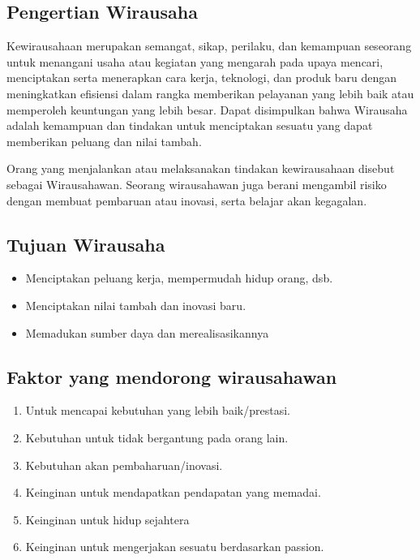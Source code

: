 \hypertarget{pengertian-wirausaha}{%
\subsection{Pengertian Wirausaha}\label{pengertian-wirausaha}}

Kewirausahaan merupakan semangat, sikap, perilaku, dan kemampuan
seseorang untuk menangani usaha atau kegiatan yang mengarah pada upaya
mencari, menciptakan serta menerapkan cara kerja, teknologi, dan produk
baru dengan meningkatkan efisiensi dalam rangka memberikan pelayanan
yang lebih baik atau memperoleh keuntungan yang lebih besar. Dapat
disimpulkan bahwa Wirausaha adalah kemampuan dan tindakan untuk
menciptakan sesuatu yang dapat memberikan peluang dan nilai tambah.

Orang yang menjalankan atau melaksanakan tindakan kewirausahaan disebut
sebagai Wirausahawan. Seorang wirausahawan juga berani mengambil risiko
dengan membuat pembaruan atau inovasi, serta belajar akan kegagalan.

\hypertarget{tujuan-wirausaha}{%
\subsection{Tujuan Wirausaha}\label{tujuan-wirausaha}}

\begin{itemize}
\tightlist
\item
  Menciptakan peluang kerja, mempermudah hidup orang, dsb.
\item
  Menciptakan nilai tambah dan inovasi baru.
\item
  Memadukan sumber daya dan merealisasikannya
\end{itemize}

\hypertarget{faktor-yang-mendorong-wirausahawan}{%
\subsection{Faktor yang mendorong
wirausahawan}\label{faktor-yang-mendorong-wirausahawan}}

\begin{enumerate}
\def\labelenumi{\arabic{enumi}.}
\tightlist
\item
  Untuk mencapai kebutuhan yang lebih baik/prestasi.
\item
  Kebutuhan untuk tidak bergantung pada orang lain.
\item
  Kebutuhan akan pembaharuan/inovasi.
\item
  Keinginan untuk mendapatkan pendapatan yang memadai.
\item
  Keinginan untuk hidup sejahtera
\item
  Keinginan untuk mengerjakan sesuatu berdasarkan passion.
\end{enumerate}

